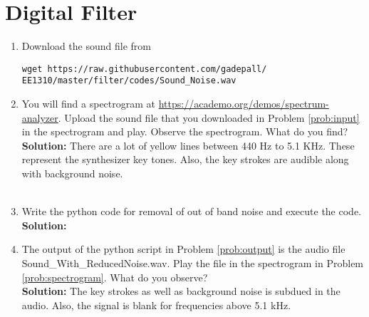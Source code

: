 \documentclass[journal,12pt,twocolumn]{IEEEtran}
\renewcommand\thesection{\arabic{section}}
\newcommand{\solution}{\noindent \textbf{Solution: }}
\numberwithin{equation}{section}
\renewcommand\thesection{\arabic{section}}
\begin{document}
\section{Digital Filter}
\begin{enumerate}[label=\thesection.\arabic*
,ref=\thesection.\theenumi]
\item
\label{prob:input}
Download the sound file from  
\begin{lstlisting}
wget https://raw.githubusercontent.com/gadepall/ 
EE1310/master/filter/codes/Sound_Noise.wav
\end{lstlisting}
\item
\label{prob:spectrogram}
You will find a spectrogram at \href{https://academo.org/demos/spectrum-analyzer}{\url{https://academo.org/demos/spectrum-analyzer}}. 
%
Upload the sound file that you downloaded in Problem \ref{prob:input} in the spectrogram  and play.  Observe the spectrogram. What do you find?
\\
%
\solution There are a lot of yellow lines between 440 Hz to 5.1 KHz.  These represent the synthesizer key tones. Also, the key strokes are audible along with background noise.\\\\
\item
\label{prob:output}
Write the python code for removal of out of band noise and execute the code.
\\
\solution

%
\item
The output of the python script in Problem \ref{prob:output} is the audio file Sound\_With\_ReducedNoise.wav. Play the file in the spectrogram in Problem \ref{prob:spectrogram}. What do you observe?
\\
\solution The key strokes as well as background noise is subdued in the audio.  Also,  the signal is blank for frequencies above 5.1 kHz.
\end{enumerate}
\end{document}
